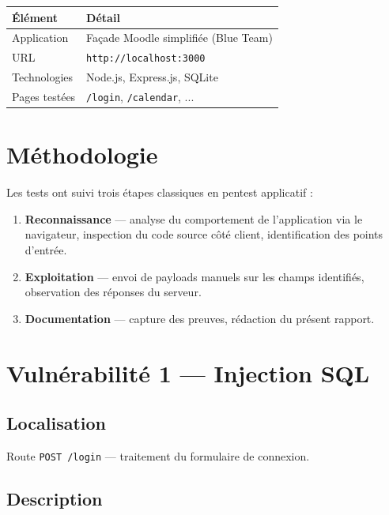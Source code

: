 \documentclass[a4paper,12pt]{article}
\begin{document}
\begin{tabular}{ll}
    \toprule
    \textbf{Élément}      & \textbf{Détail} \\
    \midrule
    Application           & Façade Moodle simplifiée (Blue Team) \\
    URL                   & \texttt{http://localhost:3000} \\
    Technologies          & Node.js, Express.js, SQLite \\
    Pages testées         & \texttt{/login}, \texttt{/calendar}, ... \\
    \bottomrule
\end{tabular}

\section{Méthodologie}

Les tests ont suivi trois étapes classiques en pentest applicatif :

\begin{enumerate}
    \item \textbf{Reconnaissance} — analyse du comportement de l'application via le navigateur,
    inspection du code source côté client, identification des points d'entrée.

    \item \textbf{Exploitation} — envoi de payloads manuels sur les champs identifiés,
    observation des réponses du serveur.

    \item \textbf{Documentation} — capture des preuves, rédaction du présent rapport.
\end{enumerate}

\newpage

\section{Vulnérabilité 1 — Injection SQL}

\subsection{Localisation}

Route \texttt{POST /login} — traitement du formulaire de connexion.

\subsection{Description}
\end{document}
